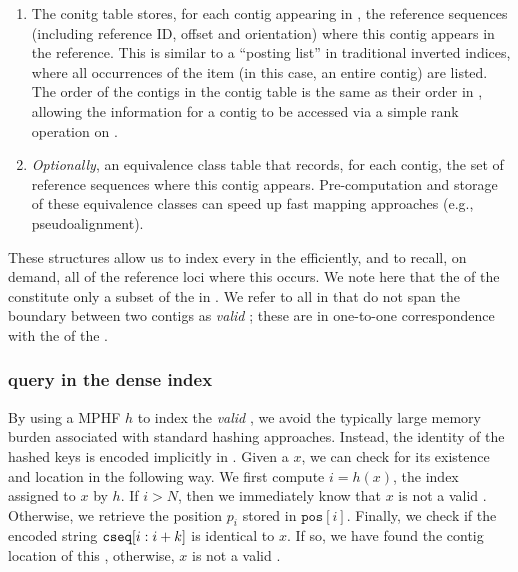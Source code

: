 \begin{enumerate}
\item The conitg table \ctab stores, for each contig appearing in \cseq, the reference
  sequences (including reference ID, offset and orientation) where this contig appears in the
  reference. This is similar to a ``posting list'' in traditional inverted
  indices, where all occurrences of the item (in this case, an entire \ccdbg
  contig) are listed. The order of the contigs in the contig table is the same
  as their order in \cseq, allowing the information for a contig to be accessed
  via a simple rank operation on \bv.

\label{items:dense5}

\item \emph{Optionally}, an equivalence class table that records, for each
  contig, the set of reference sequences where this contig appears.
  Pre-computation and storage of these equivalence classes can speed up fast
  mapping approaches (e.g., pseudoalignment).

\end{enumerate}

These structures allow us to index every \kmer in the \ccdbg efficiently, and to
recall, on demand, all of the reference loci where this \kmer occurs. We note
here that the \kmers of the \ccdbg constitute only a subset of the \kmers in
\cseq. We refer to all \kmers in \cseq that do not span the boundary between two
contigs as \emph{valid} \kmers; these are in one-to-one correspondence with the
\kmers of the \ccdbg.

\subsubsection*{\kmer query in the dense \pufferfish index}
By using a MPHF $h$ to index the \emph{valid} \kmers, we avoid the typically
large memory burden associated with standard hashing approaches. Instead, the
identity of the hashed keys is encoded implicitly in \cseq. Given a \kmer $x$, we
can check for its existence and location in the following way. We first compute
$i = h(x)$, the index assigned to \kmer $x$ by $h$. If $i > N$, then we
immediately know that $x$ is not a valid \kmer. Otherwise, we retrieve the
position $p_{i}$ stored in $\texttt{pos}[i]$. Finally, we check if the encoded
string $\texttt{cseq}[i:i+k]$ is identical to $x$. If so, we have found the
contig location of this \kmer, otherwise, $x$ is not a valid \kmer. 

